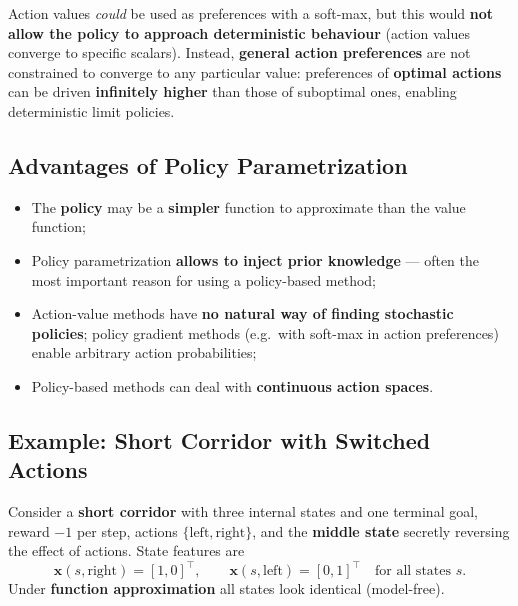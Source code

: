 \documentclass[11pt,a4paper]{article}
\theoremstyle{definition}
\theoremstyle{plain}
\theoremstyle{remark}
\begin{document}
\begin{tcolorbox}[colback=yellow!10!white, colframe=orange!80!black, title={Preferences vs.\ Action Values}]
Action values \emph{could} be used as preferences with a soft-max, but this would \textbf{not allow the policy to approach deterministic behaviour} (action values converge to specific scalars). Instead, \textbf{general action preferences} are not constrained to converge to any particular value: preferences of \textbf{optimal actions} can be driven \textbf{infinitely higher} than those of suboptimal ones, enabling deterministic limit policies.
\end{tcolorbox}

\subsection{Advantages of Policy Parametrization}

\begin{tcolorbox}[colback=green!5!white, colframe=green!60!black, title={Why Parametrize the Policy?}]
\begin{itemize}
    \item The \textbf{policy} may be a \textbf{simpler} function to approximate than the value function;
    \item Policy parametrization \textbf{allows to inject prior knowledge} — often the most important reason for using a policy-based method;
    \item Action-value methods have \textbf{no natural way of finding stochastic policies}; policy gradient methods (e.g.\ with soft-max in action preferences) enable arbitrary action probabilities;
    \item Policy-based methods can deal with \textbf{continuous action spaces}.
\end{itemize}
\end{tcolorbox}

\subsection{Example: Short Corridor with Switched Actions}

Consider a \textbf{short corridor} with three internal states and one terminal goal, reward $-1$ per step, actions $\{\text{left}, \text{right}\}$, and the \textbf{middle state} secretly reversing the effect of actions. State features are
\[
    \mathbf{x}(s, \text{right}) = [1, 0]^\top, \qquad \mathbf{x}(s, \text{left}) = [0, 1]^\top \quad \text{for all states } s.
\]
Under \textbf{function approximation} all states look identical (model-free).
\end{document}
